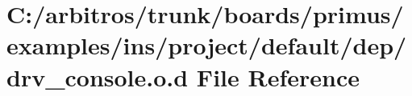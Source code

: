 \hypertarget{ins_2project_2default_2dep_2drv__console_8o_8d}{\section{C\-:/arbitros/trunk/boards/primus/examples/ins/project/default/dep/drv\-\_\-console.o.\-d File Reference}
\label{ins_2project_2default_2dep_2drv__console_8o_8d}
}
